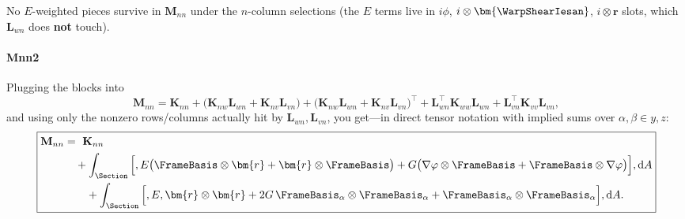 No \(E\)-weighted pieces survive in \(\mathbf{M}_{nn}\) under the \(n\)-column selections (the \(E\) terms live in \(i\phi\), \(i\otimes\bm{\WarpShearIesan}\), \(i\otimes\bm{r}\) slots, which \( \mathbf{L}_{wn}\) does \textbf{not} touch).

\paragraph{Mnn2}
Plugging the blocks into
\[
\mathbf{M}_{nn}
=\mathbf{K}_{nn}+\big(\mathbf{K}_{nw}\mathbf{L}_{wn}+\mathbf{K}_{nv}\mathbf{L}_{vn}\big)
+\big(\mathbf{K}_{nw}\mathbf{L}_{wn}+\mathbf{K}_{nv}\mathbf{L}_{vn}\big)^{\!\top}
+\mathbf{L}_{wn}^{\!\top}\mathbf{K}_{ww}\mathbf{L}_{wn}
+\mathbf{L}_{vn}^{\!\top}\mathbf{K}_{vv}\mathbf{L}_{vn},
\]
and using only the nonzero rows/columns actually hit by \(\mathbf{L}_{wn},\mathbf{L}_{vn}\), you get—in direct tensor notation with implied sums over \(\alpha,\beta\in{y,z}\):
\[
\boxed{
\begin{aligned}
\mathbf{M}_{nn}
&=\ \mathbf{K}_{nn}
\\
&\quad + \int_{\Section}\Big[,E\big(\FrameBasis\otimes\bm{r}+\bm{r}\otimes\FrameBasis\big)
+G\big(\nabla\varphi\otimes\FrameBasis+\FrameBasis\otimes\nabla\varphi\big)
\Big],\mathrm{d}A
\\
&\qquad + \int_{\Section}\Big[,E,\bm{r}\otimes\bm{r} +2G\,\FrameBasis_{\alpha}\otimes\FrameBasis_{\alpha}
+\FrameBasis_{\alpha}\otimes\FrameBasis_{\alpha}\Big],\mathrm{d}A.
\end{aligned}}
\]


